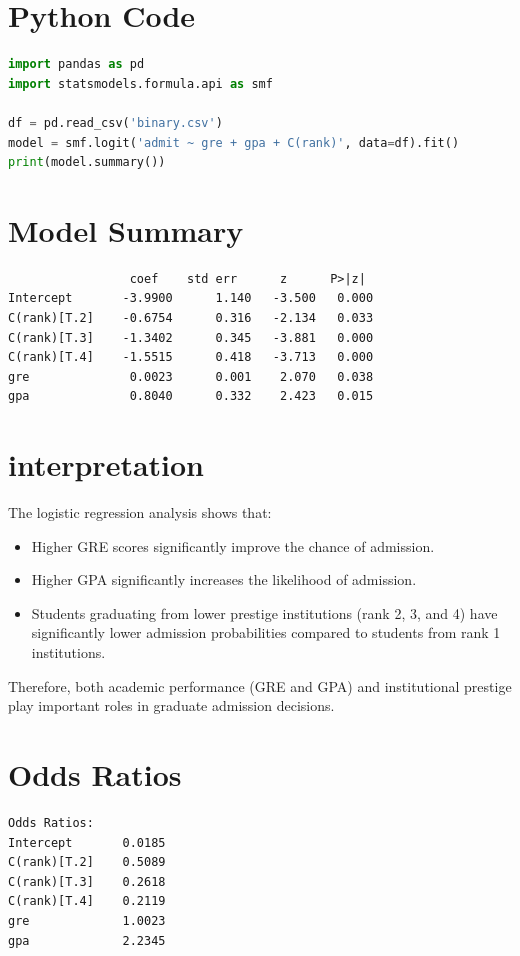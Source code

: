 \documentclass[12pt, a4paper]{article}
\begin{document}
\section*{Python Code}
\begin{lstlisting}[language=Python]
import pandas as pd
import statsmodels.formula.api as smf

df = pd.read_csv('binary.csv')
model = smf.logit('admit ~ gre + gpa + C(rank)', data=df).fit()
print(model.summary())
\end{lstlisting}

\section*{Model Summary}
\begin{outputbox}
\begin{verbatim}
                 coef    std err      z      P>|z|
Intercept       -3.9900      1.140   -3.500   0.000
C(rank)[T.2]    -0.6754      0.316   -2.134   0.033
C(rank)[T.3]    -1.3402      0.345   -3.881   0.000
C(rank)[T.4]    -1.5515      0.418   -3.713   0.000
gre              0.0023      0.001    2.070   0.038
gpa              0.8040      0.332    2.423   0.015
\end{verbatim}
\end{outputbox}
\section{interpretation}The logistic regression analysis shows that:

\begin{itemize}
    \item Higher GRE scores significantly improve the chance of admission. 
    \item Higher GPA significantly increases the likelihood of admission. 
    \item Students graduating from lower prestige institutions (rank 2, 3, and 4) have significantly lower admission probabilities compared to students from rank 1 institutions. 
\end{itemize}
Therefore, both academic performance (GRE and GPA) and institutional prestige play important roles in graduate admission decisions.

 
\section*{Odds Ratios}
\begin{outputbox}
\begin{verbatim}
Odds Ratios:
Intercept       0.0185
C(rank)[T.2]    0.5089
C(rank)[T.3]    0.2618
C(rank)[T.4]    0.2119
gre             1.0023
gpa             2.2345
\end{verbatim}
\end{outputbox}
\end{document}
